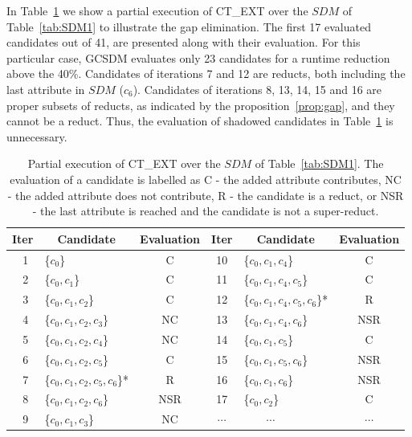 \documentclass[authoryear,11pt]{elsarticle}
\begin{document}
	In Table~\ref{tab:patial} we show a partial execution of CT\_EXT over the $SDM$ of Table~\ref{tab:SDM1} to 
	illustrate the gap elimination. The first 17 evaluated candidates out of 41, are presented 
	along with their evaluation. For this particular case, GCSDM evaluates only 23 candidates 
	for a runtime reduction above the 40\%. Candidates of iterations 7 and 12 are reducts, both including the last
	attribute in $SDM$ ($c_6$). Candidates of iterations 8, 13, 14, 15 and 16 are proper subsets of reducts, as
	indicated by the proposition~\ref{prop:gap}, and they cannot be a reduct. Thus, the evaluation of shadowed
	candidates in Table~\ref{tab:patial} is unnecessary. 
	
	\begin{table}[!htb]
		\caption{Partial execution of CT\_EXT over the $SDM$ of Table~\ref{tab:SDM1}. The evaluation of a
		 		 candidate is labelled as C - the added attribute 
				 contributes, NC - the added attribute does not contribute, R - the candidate is a reduct, or
				 NSR - the last attribute is reached and the candidate is not a super-reduct.}\label{tab:patial}
      	\centering
    		\begin{tabular}{|c|lc|c|lc|}
    		\hline
    		Iter & \multicolumn{1}{c}{Candidate} & \multicolumn{1}{c|}{Evaluation}
    		& Iter & \multicolumn{1}{c}{Candidate} & \multicolumn{1}{c|}{Evaluation}\\
    		\hline
    		~1 & \{$c_0$\} 	 				& C		& 10 & \{$c_0,c_1,c_4$\} 			& C \\	
    		~2 & \{$c_0,c_1$\}				& C 		& 11 & \{$c_0,c_1,c_4,c_5$\}		& C \\
    		~3 & \{$c_0,c_1,c_2$\} 			& C  	& 12 & \{$c_0,c_1,c_4,c_5,c_6$\}*	& R \\
    		~4 & \{$c_0,c_1,c_2,c_3$\}		& NC 	& 13 & \cellcolor[gray]{0.9}\{$c_0,c_1,c_4,c_6$\}	& NSR\\
    		~5 & \{$c_0,c_1,c_2,c_4$\}		& NC 	& 14 & \cellcolor[gray]{0.9}\{$c_0,c_1,c_5$\}		& C \\
    		~6 & \{$c_0,c_1,c_2,c_5$\} 		& C		& 15 & \cellcolor[gray]{0.9}\{$c_0,c_1,c_5,c_6$\} & NSR \\
    		~7 & \{$c_0,c_1,c_2,c_5,c_6$\}*	& R  	& 16 & \cellcolor[gray]{0.9}\{$c_0,c_1,c_6$\}	& NSR \\
    		~8 & \cellcolor[gray]{0.9}\{$c_0,c_1,c_2,c_6$\} 		& NSR 	& 17 & \{$c_0,c_2$\}			& C \\
    		~9 & \{$c_0,c_1,c_3$\}			& NC 	&$\cdots$& ~~~~$\cdots$		& $\cdots$\\
    		\hline
		\end{tabular}
	\end{table}
	
\end{document}
